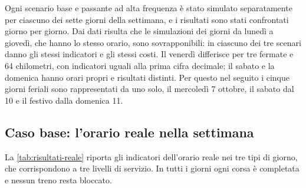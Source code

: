 Ogni scenario base e passante ad alta frequenza è stato simulato separatamente per ciascuno dei sette giorni della settimana, e i risultati sono stati confrontati giorno per giorno. Dai dati risulta che le simulazioni dei giorni da lunedì a giovedì, che hanno lo stesso orario, sono sovrapponibili: in ciascuno dei tre scenari danno gli stessi indicatori e gli stessi costi. Il venerdì differisce per tre fermate e 64 chilometri, con indicatori uguali alla prima cifra decimale; il sabato e la domenica hanno orari propri e risultati distinti. Per questo nel seguito i cinque giorni feriali sono rappresentati da uno solo, il mercoledì 7 ottobre, il sabato dal 10 e il festivo dalla domenica 11.

\subsection{Caso base: l'orario reale nella settimana}
La \cref{tab:risultati-reale} riporta gli indicatori dell'orario reale nei tre tipi di giorno, che corrispondono a tre livelli di servizio. In tutti i giorni ogni corsa è completata e nessun treno resta bloccato.

